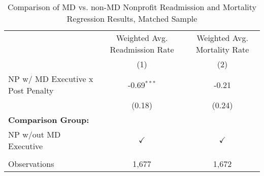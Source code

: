 \begin{table}[htbp]
   \caption{\label{tab:MD_noMD_matchsample} Comparison of MD vs. non-MD Nonprofit Readmission and Mortality Regression Results, Matched Sample}
   \bigskip
   \centering
   \begin{tabular}{lcc}
      \toprule
                                        & Weighted Avg. Readmission Rate & Weighted Avg. Mortality Rate\\  
                                        & (1)                            & (2)\\  
      \midrule 
      NP w/ MD Executive x Post Penalty & -0.69$^{***}$                  & -0.21\\   
                                        & (0.18)                         & (0.24)\\   
      \textbf{Comparison Group:}        &                                & \\  
      NP w/out MD Executive             & $\checkmark$                   & $\checkmark$\\   
       \\
      Observations                      & 1,677                          & 1,672\\  
      \bottomrule
   \end{tabular}
\end{table}


